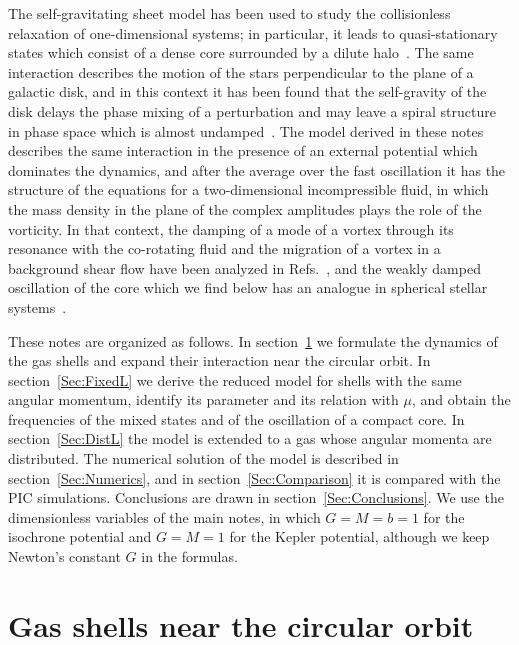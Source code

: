 \documentclass[prd,aps,nofootinbib,superscriptaddress,amsmath,amssymb]{revtex4}
\begin{document}
The self-gravitating sheet model has been used to study the collisionless relaxation of one-dimensional systems; in particular, it leads to quasi-stationary states which consist of a dense core surrounded by a dilute halo~\cite{mJtW11,yLrPfRtTfB14}. The same interaction describes the motion of the stars perpendicular to the plane of a galactic disk, and in this context it has been found that the self-gravity of the disk delays the phase mixing of a perturbation and may leave a spiral structure in phase space which is almost undamped~\cite{kDlW19,lW23,tAtA26}. The model derived in these notes describes the same interaction in the presence of an external potential which dominates the dynamics, and after the average over the fast oscillation it has the structure of the equations for a two-dimensional incompressible fluid, in which the mass density in the plane of the complex amplitudes plays the role of the vorticity. In that context, the damping of a mode of a vortex through its resonance with the co-rotating fluid and the migration of a vortex in a background shear flow have been analyzed in Refs.~\cite{dSdDaCcDiLtO00,dSdD01}, and the weakly damped oscillation of the core which we find below has an analogue in spherical stellar systems~\cite{mW94}.

These notes are organized as follows. In section~\ref{Sec:Shells} we formulate the dynamics of the gas shells and expand their interaction near the circular orbit. In section~\ref{Sec:FixedL} we derive the reduced model for shells with the same angular momentum, identify its parameter and its relation with $\mu$, and obtain the frequencies of the mixed states and of the oscillation of a compact core. In section~\ref{Sec:DistL} the model is extended to a gas whose angular momenta are distributed. The numerical solution of the model is described in section~\ref{Sec:Numerics}, and in section~\ref{Sec:Comparison} it is compared with the PIC simulations. Conclusions are drawn in section~\ref{Sec:Conclusions}. We use the dimensionless variables of the main notes, in which $G = M = b = 1$ for the isochrone potential and $G = M = 1$ for the Kepler potential, although we keep Newton's constant $G$ in the formulas.


\section{Gas shells near the circular orbit}
\label{Sec:Shells}
\end{document}
